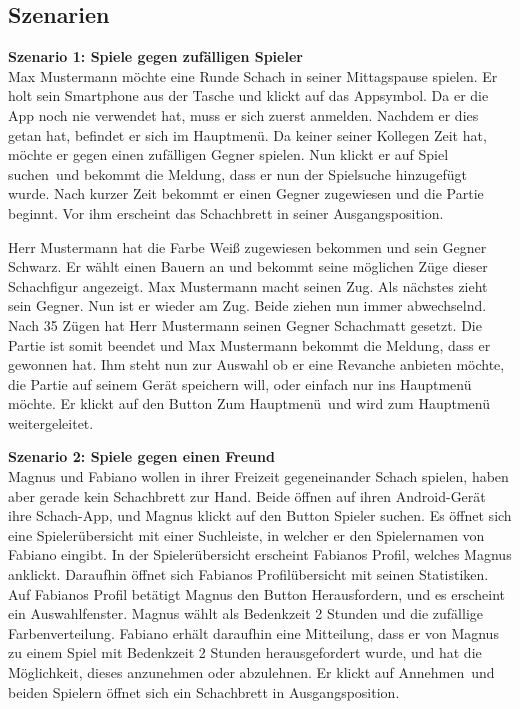\documentclass[parskip=full]{scrartcl}
\begin{document}
\subsection{Szenarien}
\textbf{Szenario 1: \glqq Spiele gegen zufälligen Spieler\grqq} \\
Max Mustermann möchte eine Runde \gls{Schach} in seiner Mittagspause spielen. Er holt sein \gls{Smartphone} aus der Tasche und klickt auf das Appsymbol.
Da er die App noch nie verwendet hat, muss er sich zuerst anmelden. Nachdem er dies getan hat, befindet er sich im Hauptmenü.
Da keiner seiner Kollegen Zeit hat, möchte er gegen einen zufälligen Gegner spielen. Nun klickt er auf \glqq Spiel suchen\grqq\ und bekommt die Meldung, dass er nun der Spielsuche hinzugefügt wurde.
Nach kurzer Zeit bekommt er einen Gegner zugewiesen und die Partie beginnt. Vor ihm erscheint das \gls{Schachbrett} in seiner \gls{Ausgangsposition}.

Herr Mustermann hat die Farbe Weiß zugewiesen bekommen und sein Gegner Schwarz. Er wählt einen Bauern an und bekommt seine möglichen Züge dieser \gls{Schachfigur} angezeigt.
Max Mustermann macht seinen Zug. Als nächstes zieht sein Gegner. Nun ist er wieder am Zug. Beide ziehen nun immer abwechselnd. Nach 35 Zügen hat Herr Mustermann
seinen Gegner \gls{Schachmatt} gesetzt. Die Partie ist somit beendet und Max Mustermann bekommt die Meldung, dass er gewonnen hat. Ihm steht nun zur Auswahl ob er eine Revanche anbieten möchte, die Partie auf seinem Gerät speichern will, oder einfach nur ins Hauptmenü möchte. Er klickt auf den Button \glqq Zum Hauptmenü\grqq\ und wird zum Hauptmenü weitergeleitet.

\textbf{Szenario 2: \glqq Spiele gegen einen Freund\grqq} \\
Magnus und Fabiano wollen in ihrer Freizeit gegeneinander Schach spielen, haben aber gerade kein Schachbrett zur Hand. Beide öffnen auf ihren \gls{Android}-Gerät ihre Schach-App, und Magnus klickt auf den Button \glqq Spieler suchen\grqq. Es öffnet sich eine Spielerübersicht mit einer Suchleiste, in welcher er den Spielernamen von Fabiano eingibt. In der Spielerübersicht erscheint Fabianos Profil, welches Magnus anklickt. Daraufhin öffnet sich Fabianos Profilübersicht mit seinen Statistiken. Auf Fabianos Profil betätigt Magnus den Button \glqq Herausfordern\grqq, und es erscheint ein Auswahlfenster. Magnus wählt als \gls{Bedenkzeit} 2 Stunden und die zufällige Farbenverteilung. Fabiano erhält daraufhin eine Mitteilung, dass er von Magnus zu einem Spiel mit \gls{Bedenkzeit} 2 Stunden herausgefordert wurde, und hat die Möglichkeit, dieses anzunehmen oder abzulehnen. Er klickt auf \glqq Annehmen\grqq\ und beiden Spielern öffnet sich ein \gls{Schachbrett} in \gls{Ausgangsposition}.
\end{document}
